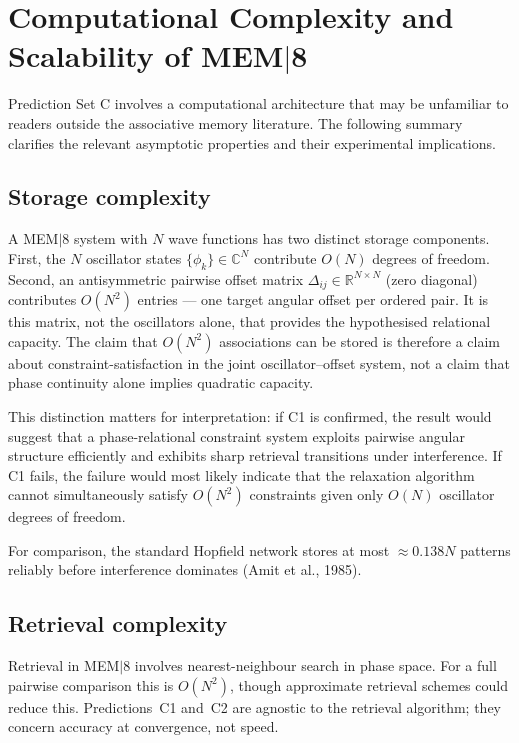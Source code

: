 \documentclass[11pt, a4paper]{article}
\newcommand{\mem}{MEM$|$8}
\begin{document}
\section{Computational Complexity and Scalability of \mem{}}

Prediction Set C involves a computational architecture that may be unfamiliar to
readers outside the associative memory literature.  The following summary clarifies
the relevant asymptotic properties and their experimental implications.

\subsection{Storage complexity}

A \mem{} system with $N$ wave functions has two distinct storage components.
First, the $N$ oscillator states $\{\phi_k\} \in \mathbb{C}^N$ contribute $O(N)$
degrees of freedom.  Second, an antisymmetric pairwise offset matrix
$\Delta_{ij} \in \mathbb{R}^{N \times N}$ (zero diagonal) contributes
$O(N^2)$ entries — one target angular offset per ordered pair.  It is this
matrix, not the oscillators alone, that provides the hypothesised relational
capacity.  The claim that $O(N^2)$ associations can be stored is therefore
a claim about constraint-satisfaction in the joint oscillator--offset system,
not a claim that phase continuity alone implies quadratic capacity.

This distinction matters for interpretation: if C1 is confirmed, the result
would suggest that a phase-relational constraint system exploits pairwise
angular structure efficiently and exhibits sharp retrieval transitions under
interference.  If C1 fails, the failure would most likely indicate that the
relaxation algorithm cannot simultaneously satisfy $O(N^2)$ constraints given
only $O(N)$ oscillator degrees of freedom.

For comparison, the standard Hopfield network stores at most $\approx 0.138N$
patterns reliably before interference dominates (Amit et al., 1985).

\subsection{Retrieval complexity}

Retrieval in \mem{} involves nearest-neighbour search in phase space.  For a
full pairwise comparison this is $O(N^2)$, though approximate retrieval schemes
could reduce this.  Predictions~C1 and~C2 are agnostic to the retrieval algorithm;
they concern accuracy at convergence, not speed.
\end{document}

